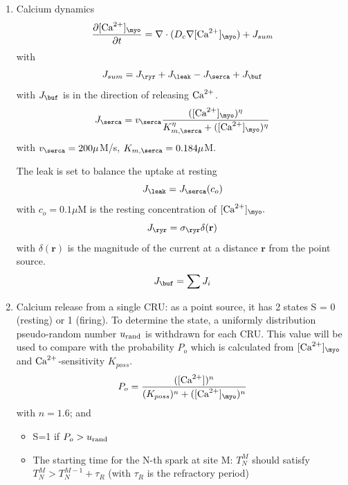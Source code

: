 \begin{enumerate}
\item Calcium dynamics
  \begin{equation}
    \label{eq:1355}
    \frac{\partial [\Ca]_\myo}{\partial t} = \nabla \cdot (D_c
    \nabla[\Ca]_\myo) + J_{sum}
  \end{equation}
with 
\begin{equation}
  \label{eq:1356}
  J_{sum} = J_\ryr + J_\leak - J_\serca + J_\buf
\end{equation}
with $J_\buf$ is in the direction of releasing ${\text{Ca}^{2+}}$.
\begin{equation}
  \label{eq:1357}
  J_\serca=v_\serca \frac{([\Ca]_\myo)^\eta}{K_{m,\serca}^\eta+([\Ca]_\myo)^\eta}
\end{equation}
with $v_\serca=200\mu$M/s, $K_{m,\serca}=0.184\mu$M.

The leak is set to balance the uptake at resting
\begin{equation}
  \label{eq:1358}
  J_\leak = J_\serca(c_o)
\end{equation}
with $c_o=0.1\mu$M is the resting concentration of $[\Ca]_\myo.$
\begin{equation}
  \label{eq:1360}
  J_\ryr = \sigma_\ryr \delta(\mathbf{r})
\end{equation}
with $\delta(\mathbf{r})$ is the magnitude of the current at a
distance $\mathbf{r}$ from the point source. 
\begin{equation}
  \label{eq:1362}
  J_\buf = \sum J_i
\end{equation}

\item Calcium release from a single CRU: as a point source, it has 2
  states S = 0 (resting) or 1 (firing). To determine the state, a
  uniformly distribution pseudo-random number $u_{\text{rand}}$ is withdrawn
  for each CRU. This value will be used to compare with the
  probability $P_o$ which is calculated from $[\Ca]_\myo$ and
  ${\text{Ca}^{2+}}$-sensitivity $K_{poss}$.
  \begin{equation}
    \label{eq:1364}
    P_o = \frac{([\Ca])^n}{(K_{poss})^n + ([\Ca]_\myo)^n}
  \end{equation}
with $n=1.6$; and
\begin{itemize}
\item S=1 if $P_o>u_{\text{rand}}$
\item The starting time for the N-th spark at site M: $T^M_N$ should
  satisfy $T^M_N > T^{M-1}_N + \tau_R$ (with $\tau_R$ is the
  refractory period)
\end{itemize}



\end{enumerate}
